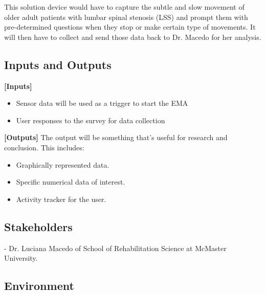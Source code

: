 \documentclass{article}
\begin{document}
This solution device would have to capture the subtle and slow movement of older adult patients with lumbar spinal stenosis (LSS) and prompt them with pre-determined questions when they stop or make certain type of  movements. It will then have to collect and send those data back to Dr. Macedo for her analysis.

\subsection{Inputs and Outputs}

\textbf{[Inputs]}
\begin{itemize}
    \item Sensor data will be used as a trigger to start the EMA
    \item User responses to the survey for data collection
\end{itemize}
\pagebreak
\textbf{[Outputs]}
\linebreak
The output will be something that's useful for research and conclusion. This includes:
\begin{itemize}
    \item Graphically represented data.
    \item Specific numerical data of interest.
    \item Activity tracker for the user.
\end{itemize}

\subsection{Stakeholders}

- Dr. Luciana Macedo of School of Rehabilitation Science at McMaster University.

\subsection{Environment}
\end{document}
